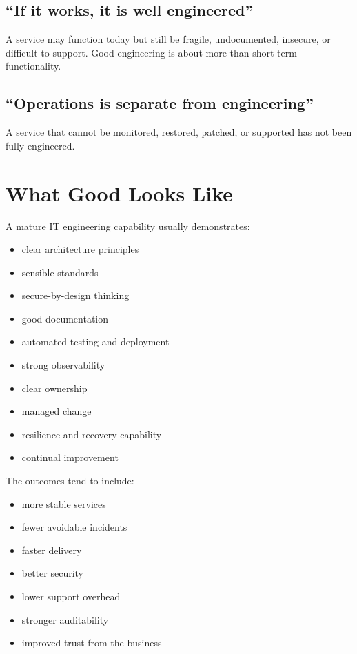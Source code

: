 \documentclass[
  british,
  letterpaper,
  DIV=11,
  numbers=noendperiod]{scrartcl}
\providecommand{\tightlist}{%
  \setlength{\itemsep}{0pt}\setlength{\parskip}{0pt}}
\begin{document}
\subsection{``If it works, it is well
engineered''}\label{if-it-works-it-is-well-engineered}

A service may function today but still be fragile, undocumented,
insecure, or difficult to support. Good engineering is about more than
short-term functionality.

\subsection{``Operations is separate from
engineering''}\label{operations-is-separate-from-engineering}

A service that cannot be monitored, restored, patched, or supported has
not been fully engineered.

\section{What Good Looks Like}\label{what-good-looks-like}

A mature IT engineering capability usually demonstrates:

\begin{itemize}
\tightlist
\item
  clear architecture principles
\item
  sensible standards
\item
  secure-by-design thinking
\item
  good documentation
\item
  automated testing and deployment
\item
  strong observability
\item
  clear ownership
\item
  managed change
\item
  resilience and recovery capability
\item
  continual improvement
\end{itemize}

The outcomes tend to include:

\begin{itemize}
\tightlist
\item
  more stable services
\item
  fewer avoidable incidents
\item
  faster delivery
\item
  better security
\item
  lower support overhead
\item
  stronger auditability
\item
  improved trust from the business
\end{itemize}
\end{document}
